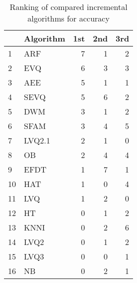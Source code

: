 \begin{table}[H]
\footnotesize
\centering
\caption{Ranking of compared incremental algorithms for accuracy}
\label{tab:Incremental places accuracy}
\begin{tabular}{llrrr}
\hline
{} & Algorithm &  1st &  2nd &  3rd \\
\hline
1  &       ARF &    7 &    1 &    2 \\
2  &       EVQ &    6 &    3 &    3 \\
3  &       AEE &    5 &    1 &    1 \\
4  &      SEVQ &    5 &    6 &    2 \\
5  &       DWM &    3 &    1 &    2 \\
6  &      SFAM &    3 &    4 &    5 \\
7  &    LVQ2.1 &    2 &    1 &    0 \\
8  &        OB &    2 &    4 &    4 \\
9  &      EFDT &    1 &    7 &    1 \\
10 &       HAT &    1 &    0 &    4 \\
11 &       LVQ &    1 &    2 &    0 \\
12 &        HT &    0 &    1 &    2 \\
13 &      KNNI &    0 &    2 &    6 \\
14 &      LVQ2 &    0 &    1 &    2 \\
15 &      LVQ3 &    0 &    0 &    1 \\
16 &        NB &    0 &    2 &    1 \\
\hline
\end{tabular}
\end{table}
